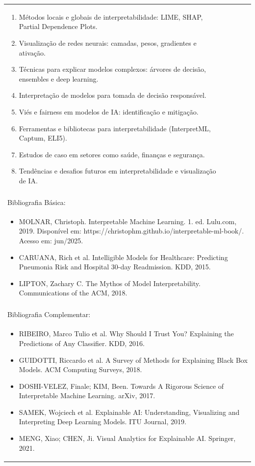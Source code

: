 \documentclass[11pt]{article}
\begin{document}
\begin{center}
\begin{longtable}{|p{4cm}|p{4cm}|p{4cm}|p{4cm}|}
{\begin{enumerate}
\item Métodos locais e globais de interpretabilidade: LIME, SHAP, Partial Dependence Plots.
\item Visualização de redes neurais: camadas, pesos, gradientes e ativação.
\item Técnicas para explicar modelos complexos: árvores de decisão, ensembles e deep learning.
\item Interpretação de modelos para tomada de decisão responsável.
\item Viés e fairness em modelos de IA: identificação e mitigação.
\item Ferramentas e bibliotecas para interpretabilidade (InterpretML, Captum, ELI5).
\item Estudos de caso em setores como saúde, finanças e segurança.
\item Tendências e desafios futuros em interpretabilidade e visualização de IA.\end{enumerate}}\\
\multicolumn{4}{|p{16cm}|}{}\\
\hline
\multicolumn{4}{|p{16cm}|}{Bibliografia Básica:}\\
\multicolumn{4}{|p{16cm}|}{%
\begin{itemize}\item MOLNAR, Christoph. Interpretable Machine Learning. 1. ed. Lulu.com, 2019. Disponível em: https://christophm.github.io/interpretable-ml-book/. Acesso em: jun/2025.
\item CARUANA, Rich et al. Intelligible Models for Healthcare: Predicting Pneumonia Risk and Hospital 30-day Readmission. KDD, 2015.
\item LIPTON, Zachary C. The Mythos of Model Interpretability. Communications of the ACM, 2018.\end{itemize}}\\
\multicolumn{4}{|p{16cm}|}{}\\
\hline
\multicolumn{4}{|p{16cm}|}{Bibliografia Complementar:}\\
\multicolumn{4}{|p{16cm}|}{%
\begin{itemize}\item RIBEIRO, Marco Tulio et al. Why Should I Trust You? Explaining the Predictions of Any Classifier. KDD, 2016.
\item GUIDOTTI, Riccardo et al. A Survey of Methods for Explaining Black Box Models. ACM Computing Surveys, 2018.
\item DOSHI-VELEZ, Finale; KIM, Been. Towards A Rigorous Science of Interpretable Machine Learning. arXiv, 2017.
\item SAMEK, Wojciech et al. Explainable AI: Understanding, Visualizing and Interpreting Deep Learning Models. ITU Journal, 2019.
\item MENG, Xiao; CHEN, Ji. Visual Analytics for Explainable AI. Springer, 2021.\end{itemize}}\\
\hline
\end{longtable}
\end{center}
\end{document}
